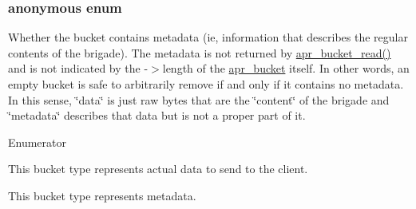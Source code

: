 \subsubsection[{\texorpdfstring{anonymous enum}{anonymous enum}}]{\setlength{\rightskip}{0pt plus 5cm}anonymous enum}\hypertarget{structapr__bucket__type__t_a2c083ffe204e7b680e2de9edbf17a4b1}{}\label{structapr__bucket__type__t_a2c083ffe204e7b680e2de9edbf17a4b1}
Whether the bucket contains metadata (ie, information that describes the regular contents of the brigade). The metadata is not returned by \hyperlink{group__APR__Util__Bucket__Brigades_gae44ae938c6c60e148430fdb098dcf28f}{apr\+\_\+bucket\+\_\+read()} and is not indicated by the -\/$>$length of the \hyperlink{structapr__bucket}{apr\+\_\+bucket} itself. In other words, an empty bucket is safe to arbitrarily remove if and only if it contains no metadata. In this sense, \char`\"{}data\char`\"{} is just raw bytes that are the \char`\"{}content\char`\"{} of the brigade and \char`\"{}metadata\char`\"{} describes that data but is not a proper part of it. \begin{Desc}
\item[Enumerator]\par
\begin{description}
\item[{\em 
A\+P\+R\+\_\+\+B\+U\+C\+K\+E\+T\+\_\+\+D\+A\+TA\hypertarget{structapr__bucket__type__t_a2c083ffe204e7b680e2de9edbf17a4b1a53d3ef9d6a275fe2b72a91acea7017d5}{}\label{structapr__bucket__type__t_a2c083ffe204e7b680e2de9edbf17a4b1a53d3ef9d6a275fe2b72a91acea7017d5}
}]This bucket type represents actual data to send to the client. \item[{\em 
A\+P\+R\+\_\+\+B\+U\+C\+K\+E\+T\+\_\+\+M\+E\+T\+A\+D\+A\+TA\hypertarget{structapr__bucket__type__t_a2c083ffe204e7b680e2de9edbf17a4b1a9bf38b4eb3ea41c4af230432ac7a5fb1}{}\label{structapr__bucket__type__t_a2c083ffe204e7b680e2de9edbf17a4b1a9bf38b4eb3ea41c4af230432ac7a5fb1}
}]This bucket type represents metadata. \end{description}
\end{Desc}

